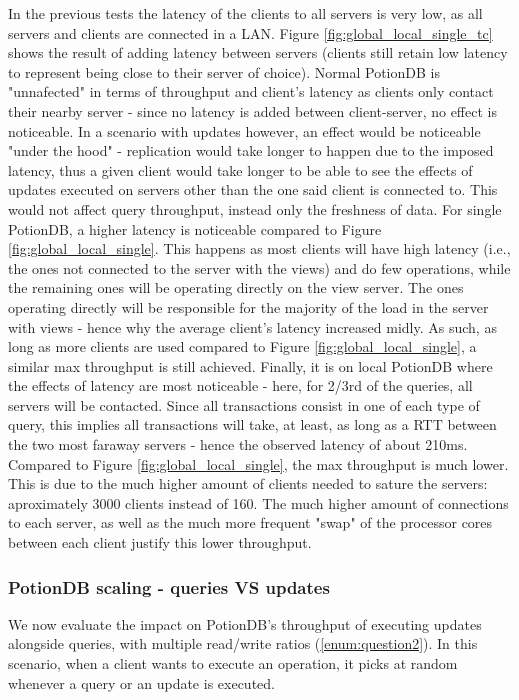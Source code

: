 \documentclass[sigplan,10pt]{acmart}
\begin{document}
In the previous tests the latency of the clients to all servers is very low, as all servers and clients are connected in a LAN.
Figure \ref{fig:global_local_single_tc} shows the result of adding latency between servers (clients still retain low latency to represent being close to their server of choice).
Normal PotionDB is "unnafected" in terms of throughput and client's latency as clients only contact their nearby server - since no latency is added between client-server, no effect is noticeable.
In a scenario with updates however, an effect would be noticeable "under the hood" - replication would take longer to happen due to the imposed latency, thus a given client would take longer to be able to see the effects of updates executed on servers other than the one said client is connected to.
This would not affect query throughput, instead only the freshness of data.
For single PotionDB, a higher latency is noticeable compared to Figure \ref{fig:global_local_single}.
This happens as most clients will have high latency (i.e., the ones not connected to the server with the views) and do few operations, while the remaining ones will be operating directly on the view server.
The ones operating directly will be responsible for the majority of the load in the server with views - hence why the average client's latency increased midly.
As such, as long as more clients are used compared to Figure \ref{fig:global_local_single}, a similar max throughput is still achieved.
Finally, it is on local PotionDB where the effects of latency are most noticeable - here, for 2/3rd of the queries, all servers will be contacted. Since all transactions consist in one of each type of query, this implies all transactions will take, at least, as long as a RTT between the two most faraway servers - hence the observed latency of about 210ms.
Compared to Figure \ref{fig:global_local_single}, the max throughput is much lower. This is due to the much higher amount of clients needed to sature the servers: aproximately 3000 clients instead of 160.
The much higher amount of connections to each server, as well as the much more frequent "swap" of the processor cores between each client justify this lower throughput.

\subsubsection{PotionDB scaling - queries VS updates}

We now evaluate the impact on PotionDB's throughput of executing updates alongside queries, with multiple read/write ratios (\ref{enum:question2}).
In this scenario, when a client wants to execute an operation, it picks at random whenever a query or an update is executed.
\end{document}
